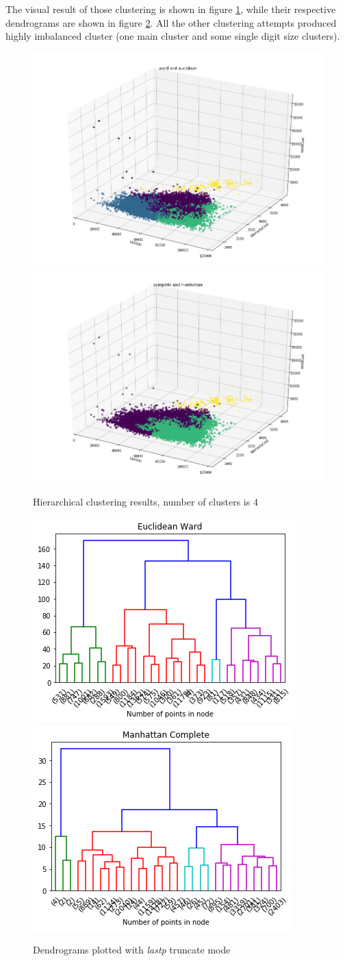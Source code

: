 \documentclass{article}
\begin{document}
	The visual result of those clustering is shown in figure \ref{fig:hier}, while their respective dendrograms are shown in figure \ref{fig:dend}. All the other clustering attempts produced highly imbalanced cluster (one main cluster and some single digit size clusters).
	\begin{figure}[H]
		\centering
		\includegraphics[width=.49\textwidth]{wardeucl}\hfill
		\includegraphics[width=.49\textwidth]{complman}\hfill
		\caption{Hierarchical clustering results, number of clusters is 4}
		\label{fig:hier}
	\end{figure}
	\begin{figure}[H]
		\centering
		\includegraphics[width=.49\textwidth]{dendeuc}\hfill
		\includegraphics[width=.49\textwidth]{dendman}\hfill
		\caption{Dendrograms plotted with \emph{lastp} truncate mode}
		\label{fig:dend}
	\end{figure}
	
\end{document}
